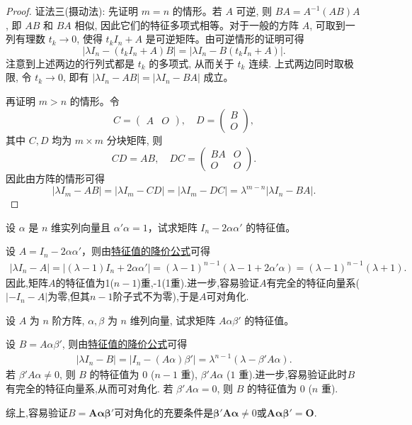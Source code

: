 \documentclass[../../main.tex]{subfiles}
\begin{document}
\begin{proof}
{\color{blue}证法三(摄动法):} 先证明 \(m = n\) 的情形。若 \(A\) 可逆, 则 \(BA = A^{-1}(AB)A\), 即 \(AB\) 和 \(BA\) 相似, 因此它们的特征多项式相等。对于一般的方阵 \(A\), 可取到一列有理数 \(t_k \to 0\), 使得 \(t_k I_n + A\) 是可逆矩阵。由可逆情形的证明可得
\[
|\lambda I_n - (t_k I_n + A)B| = |\lambda I_n - B(t_k I_n + A)|.
\]
注意到上述两边的行列式都是 \( t_k \) 的多项式, 从而关于 \( t_k \) 连续. 上式两边同时取极限, 令 \( t_k \to 0 \), 即有
\(
|\lambda I_n - AB| = |\lambda I_n - BA|
\)
成立。

再证明 \( m > n \) 的情形。令
\[
C = \begin{pmatrix}
A & O
\end{pmatrix}, \quad D = \begin{pmatrix}
B \\
O
\end{pmatrix},
\]
其中 \( C, D \) 均为 \( m \times m \) 分块矩阵, 则
\[
CD = AB, \quad DC = \begin{pmatrix}
BA & O \\
O & O
\end{pmatrix}.
\]
因此由方阵的情形可得
\[
|\lambda I_m - AB| = |\lambda I_m - CD| = |\lambda I_m - DC| = \lambda^{m-n} |\lambda I_n - BA|.
\]
\end{proof}

\begin{example}
设 $\alpha$ 是 $n$ 维实列向量且 $\alpha' \alpha = 1$，试求矩阵 $I_n - 2 \alpha \alpha'$ 的特征值。
\end{example}
\begin{solution}
设 $A = I_n - 2 \alpha \alpha'$，则由\hyperref[theorem:特征值的降价公式]{特征值的降价公式}可得
\begin{align*}
| \lambda I_n - A | 
= | (\lambda - 1) I_n + 2 \alpha \alpha' | 
= (\lambda - 1)^{n-1} (\lambda - 1 + 2 \alpha' \alpha) 
= (\lambda - 1)^{n-1} (\lambda + 1).
\end{align*}
因此,矩阵$A$的特征值为1($n-1$)重,-1(1重).进一步,容易验证$A$有完全的特征向量系($| -I_n - A | $为零,但其$n-1$阶子式不为零),于是$A$可对角化.
\end{solution}

\begin{example}\label{example-6.10}
设 $A$ 为 $n$ 阶方阵, $\alpha, \beta$ 为 $n$ 维列向量, 试求矩阵 $A \alpha \beta'$ 的特征值。
\end{example}
\begin{solution}
设 $B = A \alpha \beta'$, 则由\hyperref[theorem:特征值的降价公式]{特征值的降价公式}可得
\begin{align*}
| \lambda I_n - B | 
= | I_n - (A \alpha) \beta' | 
= \lambda^{n-1} (\lambda - \beta' A \alpha).
\end{align*}
若 $\beta' A \alpha \neq 0$, 则 $B$ 的特征值为 $0$ ($n-1$ 重), $\beta' A \alpha$ ($1$ 重).进一步,容易验证此时$B$有完全的特征向量系,从而可对角化.
若 $\beta' A \alpha = 0$, 则 $B$ 的特征值为 $0$ ($n$ 重).

综上,容易验证\(B=\boldsymbol{A}\boldsymbol{\alpha}\boldsymbol{\beta}'\)可对角化的充要条件是\(\boldsymbol{\beta}'\boldsymbol{A}\boldsymbol{\alpha}\neq 0\)或\(\boldsymbol{A}\boldsymbol{\alpha}\boldsymbol{\beta}' = \boldsymbol{O}\).
\end{solution}
\end{document}
